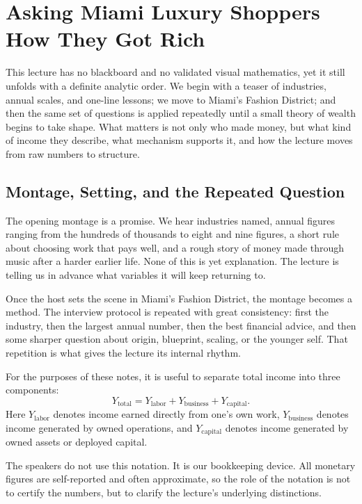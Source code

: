 \chapter{Asking Miami Luxury Shoppers How They Got Rich}

This lecture has no blackboard and no validated visual mathematics, yet it still unfolds with a definite analytic order. We begin with a teaser of industries, annual scales, and one-line lessons; we move to Miami's Fashion District; and then the same set of questions is applied repeatedly until a small theory of wealth begins to take shape. What matters is not only who made money, but what kind of income they describe, what mechanism supports it, and how the lecture moves from raw numbers to structure.

\section{Montage, Setting, and the Repeated Question}

The opening montage is a promise. We hear industries named, annual figures ranging from the hundreds of thousands to eight and nine figures, a short rule about choosing work that pays well, and a rough story of money made through music after a harder earlier life. None of this is yet explanation. The lecture is telling us in advance what variables it will keep returning to.

Once the host sets the scene in Miami's Fashion District, the montage becomes a method. The interview protocol is repeated with great consistency: first the industry, then the largest annual number, then the best financial advice, and then some sharper question about origin, blueprint, scaling, or the younger self. That repetition is what gives the lecture its internal rhythm.

\begin{definition}
For the purposes of these notes, it is useful to separate total income into three components:
\begin{equation}
Y_{\mathrm{total}} = Y_{\mathrm{labor}} + Y_{\mathrm{business}} + Y_{\mathrm{capital}}.
\end{equation}
Here \(Y_{\mathrm{labor}}\) denotes income earned directly from one's own work, \(Y_{\mathrm{business}}\) denotes income generated by owned operations, and \(Y_{\mathrm{capital}}\) denotes income generated by owned assets or deployed capital.
\end{definition}

\begin{remark}
The speakers do not use this notation. It is our bookkeeping device. All monetary figures are self-reported and often approximate, so the role of the notation is not to certify the numbers, but to clarify the lecture's underlying distinctions.
\end{remark}

